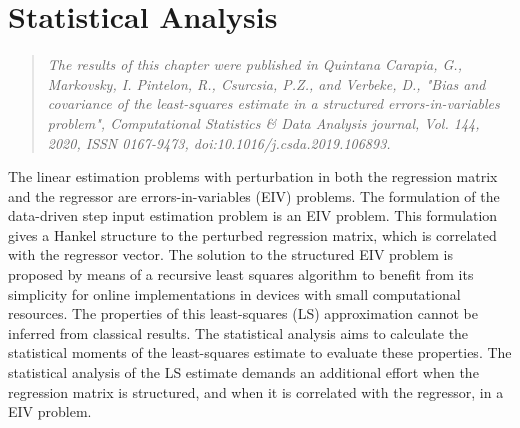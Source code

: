 \glsresetall

\chapter{Statistical Analysis} \label{chap:StatisticalAnalysis}


\begin{quote}
\emph{The results of this chapter were published in Quintana Carapia, G., Markovsky, I. Pintelon, R., Csurcsia, P.Z., and Verbeke, D., "Bias and covariance of the least-squares estimate in a structured errors-in-variables problem", Computational Statistics \& Data Analysis journal, Vol. 144, 2020, ISSN 0167-9473, doi:10.1016/j.csda.2019.106893. \nocite{QuintanaCSDA} }\vfill{}
\end{quote}




The linear estimation problems with perturbation in both the regression matrix and the regressor are errors-in-variables (EIV) problems.
\color{blue} The formulation of the data-driven step input estimation problem is an EIV problem.
This formulation gives a Hankel structure to the perturbed regression matrix, which is correlated with the regressor vector.
The solution to the structured EIV problem is proposed by means of a recursive least squares algorithm to benefit from its simplicity for online implementations in devices with small computational resources.
The properties of this least-squares (LS) approximation cannot be inferred from classical results\color{black}.
\color{blue} The statistical analysis aims \color{black} to calculate the statistical moments of the \color{blue} least-squares \color{black} estimate to evaluate these properties.
The statistical analysis of the LS estimate demands \color{blue} an additional effort \color{black} when the regression matrix is structured, and when it is correlated with the regressor, in a EIV problem.

